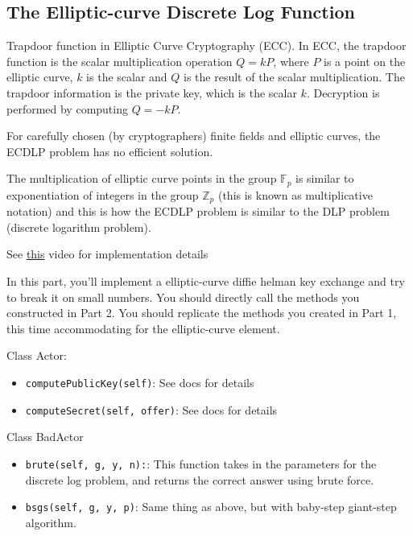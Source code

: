 \documentclass{article}
\begin{document}
\subsection*{The Elliptic-curve Discrete Log Function}



    \vspace{3mm}
    Trapdoor function in Elliptic Curve Cryptography (ECC). In ECC, the trapdoor function is the scalar multiplication operation $Q = kP$, where $P$ is a point on the elliptic curve, $k$ is the scalar and $Q$ is the result of the scalar multiplication. The trapdoor information is the private key, which is the scalar $k$. Decryption is performed by computing $Q = -kP$.


For carefully chosen (by cryptographers) finite fields and elliptic curves, the ECDLP problem has no efficient solution.

The multiplication of elliptic curve points in the group $\mathbb{F}_{p}$ is similar to exponentiation of integers in the group $\mathbb{Z}_{p}$ (this is known as multiplicative notation) and this is how the ECDLP problem is similar to the DLP problem (discrete logarithm problem).

See \href{https://www.youtube.com/watch?v=gAtBM06xwaw}{this} video for implementation details

\begin{tcolorbox}
    In this part, you'll implement a elliptic-curve diffie helman key exchange and try to break it on small numbers. You should directly call the methods you constructed in Part 2. You should replicate the methods you created in Part 1, this time accommodating for the elliptic-curve element.

    Class Actor:
    \begin{itemize}
        \item \lstinline{computePublicKey(self)}: See docs for details
        \item \lstinline{computeSecret(self, offer)}: See docs for details
    \end{itemize}

    Class BadActor
    \begin{itemize}
        \item \lstinline{brute(self, g, y, n):}: This function takes in the parameters for the discrete log problem, and returns the correct answer using brute force.
        \item \lstinline{bsgs(self, g, y, p)}: Same thing as above, but with baby-step giant-step algorithm.
    \end{itemize}
\end{tcolorbox}
\end{document}
